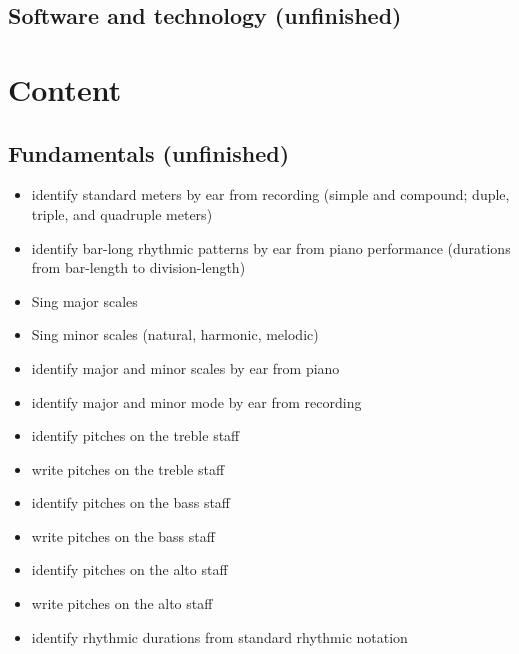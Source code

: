 \section{Software and technology (unfinished)}
\label{softwareandtechnologyunfinished}

\chapter{Content}
\label{content}

\section{Fundamentals (unfinished)}
\label{fundamentalsunfinished}

\begin{itemize}
\item identify standard meters by ear from recording (simple and compound; duple, triple, and quadruple meters)

\item identify bar-long rhythmic patterns by ear from piano performance (durations from bar-length to division-length)

\item Sing major scales

\item Sing minor scales (natural, harmonic, melodic)

\item identify major and minor scales by ear from piano

\item identify major and minor mode by ear from recording

\item identify pitches on the treble staff

\item write pitches on the treble staff

\item identify pitches on the bass staff

\item write pitches on the bass staff

\item identify pitches on the alto staff

\item write pitches on the alto staff

\item identify rhythmic durations from standard rhythmic notation


\end{itemize}
